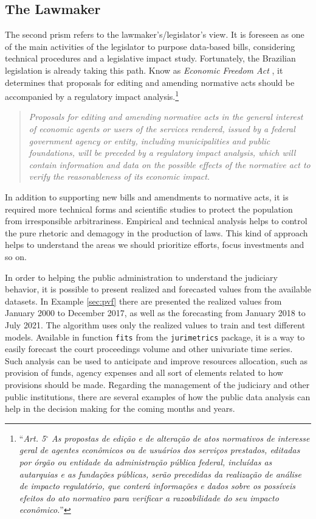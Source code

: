 \documentclass[a4paper]{exam}
\theoremstyle{plain}
\begin{document}
\subsection{The Lawmaker}

The second prism refers to the lawmaker's/legislator's view. It is foreseen as one of the main activities of the legislator to purpose data-based bills, considering technical procedures and a legislative impact study. Fortunately, the Brazilian legislation is already taking this path. Know as \textit{Economic Freedom Act} \cite{brasil2019lei}, it determines that proposals for editing and amending normative acts should be accompanied by a regulatory impact analysis.\footnote{``\textit{Art. 5$^{\circ}$  As propostas de edição e de alteração de atos normativos de interesse geral de agentes econômicos ou de usuários dos serviços prestados, editadas por órgão ou entidade da administração pública federal, incluídas as autarquias e as fundações públicas, serão precedidas da realização de análise de impacto regulatório, que conterá informações e dados sobre os possíveis efeitos do ato normativo para verificar a razoabilidade do seu impacto econômico.}''}

\begin{quote}
\textit{Proposals for editing and amending normative acts in the general interest of economic agents or users of the services rendered, issued by a federal government agency or entity, including municipalities and public foundations, will be preceded by a regulatory impact analysis, which will contain information and data on the possible effects of the normative act to verify the reasonableness of its economic impact.} \cite[Art. 5]{brasil2019lei}
\end{quote}

In addition to supporting new bills and amendments to normative acts, it is required more technical forms and scientific studies to protect the population from irresponsible arbitrariness. Empirical and technical analysis helps to control the pure rhetoric and demagogy in the production of laws. This kind of approach helps to understand the areas we should prioritize efforts, focus investments and so on.

In order to helping the public administration to understand the judiciary behavior, it is possible to present realized and forecasted values from the available datasets. In Example \ref{sec:pvf} there are presented the realized values from January 2000 to December 2017, as well as the forecasting from January 2018 to July 2021. The algorithm uses only the realized values to train and test different models. Available in function \texttt{fits} from the \texttt{jurimetrics} package, it is a way to easily forecast the court proceedings volume and other univariate time series. Such analysis can be used to anticipate and improve resources allocation, such as provision of funds, agency expenses and all sort of elements related to how provisions should be made. Regarding the management of the judiciary and other public institutions, there are several examples of how the public data analysis can help in the decision making for the coming months and years. 
\end{document}

